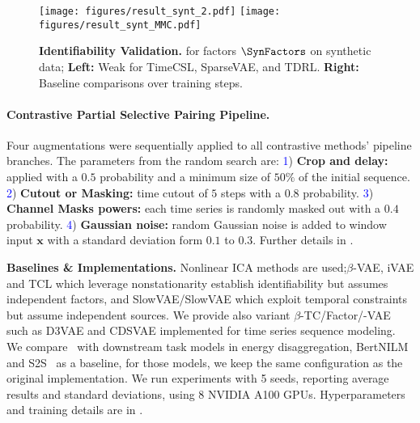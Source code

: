 \documentclass{article} %
\theoremstyle{plain}
\theoremstyle{definition}
\theoremstyle{remark}
\numberwithin{equation}{section}
\begin{document}
\begin{figure}
    \centering
    \vspace{-0.3cm}
    \texttt{[image: figures/result\_synt\_2.pdf]}
    \texttt{[image: figures/result\_synt\_MMC.pdf]}
    \vspace{-0.6cm}
    \caption{\textbf{Identifiability Validation.} \MCC for factors $\SynFactors$ on synthetic data; \textbf{Left:} Weak \MCC for TimeCSL, SparseVAE, and TDRL. \textbf{Right:} Baseline comparisons over training steps.}
    \label{fig:validation_mcc_synthetic}
    \vspace{-0.5cm}
\end{figure}

\vspace{-0.1cm}
\paragraph{Contrastive Partial Selective Pairing Pipeline.}\label{exp:partial_selective} Four augmentations were sequentially applied to all contrastive methods' pipeline branches. The parameters from the random search are: \textcolor{blue}{1}) \textbf{Crop and delay:} applied with a $0.5$ probability and a minimum size of $50\%$ of the initial sequence. \textcolor{blue}{2}) \textbf{Cutout or Masking:} time cutout of $5$ steps with a $0.8$ probability. \textcolor{blue}{3}) \textbf{Channel Masks powers:} each time series is randomly masked out with a $0.4$ probability. \textcolor{blue}{4}) \textbf{Gaussian noise:} random Gaussian noise is added to window input $\mathbf{x}$ with a standard deviation form $0.1$ to $0.3$. Further details in .

\textbf{Baselines \& Implementations.} Nonlinear ICA methods are used;$\beta$-VAE, iVAE and TCL which leverage nonstationarity establish identifiability but assumes independent factors, and SlowVAE/SlowVAE which
exploit temporal constraints but assume independent sources. We provide also variant $\beta$-TC/Factor/-VAE such as D3VAE and CDSVAE implemented for time series sequence modeling. We compare \TimeCSL~with downstream task models in energy disaggregation, BertNILM~\citep{yue_bert4nilm_2020} and S2S~\citep{chen_convolutional_2018} as a baseline, for those models, we keep the same configuration as the original implementation. We run experiments with 5 seeds, reporting average results and standard deviations, using 8 NVIDIA A100 GPUs. Hyperparameters and training details are in . %
 
\end{document}
